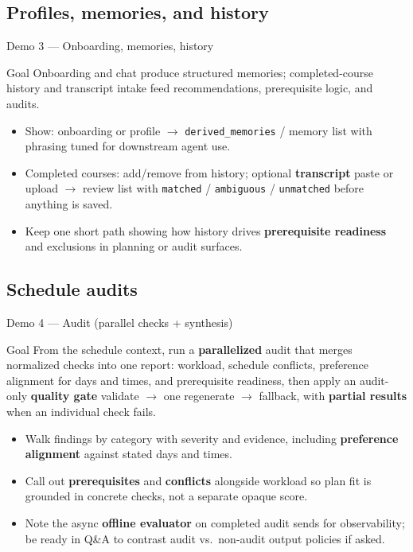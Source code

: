\documentclass[10pt,compress,english]{beamer}
\begin{document}
\subsection{Profiles, memories, and history}

\begin{frame}{Demo 3 --- Onboarding, memories, history}
  \begin{block}{Goal}
    Onboarding and chat produce structured memories; completed-course history and transcript intake feed recommendations, prerequisite logic, and audits.
  \end{block}
  \begin{itemize}\setlength\itemsep{0.22em}
    \item Show: onboarding or profile $\rightarrow$ \texttt{derived\_memories} / memory list with phrasing tuned for downstream agent use.
    \item Completed courses: add/remove from history; optional \textbf{transcript} paste or upload $\rightarrow$ review list with \texttt{matched} / \texttt{ambiguous} / \texttt{unmatched} before anything is saved.
    \item Keep one short path showing how history drives \textbf{prerequisite readiness} and exclusions in planning or audit surfaces.
  \end{itemize}
\end{frame}

\subsection{Schedule audits}

\begin{frame}{Demo 4 --- Audit (parallel checks + synthesis)}
  \begin{block}{Goal}
    From the schedule context, run a \textbf{parallelized} audit that merges normalized checks into one report: workload, schedule conflicts, preference alignment for days and times, and prerequisite readiness, then apply an audit-only \textbf{quality gate} validate $\rightarrow$ one regenerate $\rightarrow$ fallback, with \textbf{partial results} when an individual check fails.
  \end{block}
  \begin{itemize}\setlength\itemsep{0.22em}
    \item Walk findings by category with severity and evidence, including \textbf{preference alignment} against stated days and times.
    \item Call out \textbf{prerequisites} and \textbf{conflicts} alongside workload so plan fit is grounded in concrete checks, not a separate opaque score.
    \item Note the async \textbf{offline evaluator} on completed audit sends for observability; be ready in Q\&A to contrast audit vs.\ non-audit output policies if asked.
  \end{itemize}
\end{frame}
\end{document}
